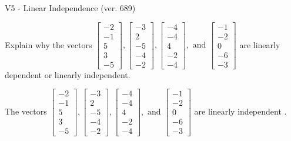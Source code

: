\begin{exercise}
  \begin{exerciseTitle}V5 - Linear Independence (ver. 689)\end{exerciseTitle}
  \begin{exerciseStatement}
    Explain why the vectors \(\left[\begin{array}{r}
-2 \\
-1 \\
5 \\
3 \\
-5
\end{array}\right] , \left[\begin{array}{r}
-3 \\
2 \\
-5 \\
-4 \\
-2
\end{array}\right] , \left[\begin{array}{r}
-4 \\
-4 \\
4 \\
-2 \\
-4
\end{array}\right] , \text{ and } \left[\begin{array}{r}
-1 \\
-2 \\
0 \\
-6 \\
-3
\end{array}\right]\) are linearly dependent or linearly independent.	


  \end{exerciseStatement}
  \begin{exerciseAnswer}
   The vectors \(\left[\begin{array}{r}
-2 \\
-1 \\
5 \\
3 \\
-5
\end{array}\right] , \left[\begin{array}{r}
-3 \\
2 \\
-5 \\
-4 \\
-2
\end{array}\right] , \left[\begin{array}{r}
-4 \\
-4 \\
4 \\
-2 \\
-4
\end{array}\right] , \text{ and } \left[\begin{array}{r}
-1 \\
-2 \\
0 \\
-6 \\
-3
\end{array}\right]\) are 
  	 linearly independent  .
  


  \end{exerciseAnswer}
\end{exercise}